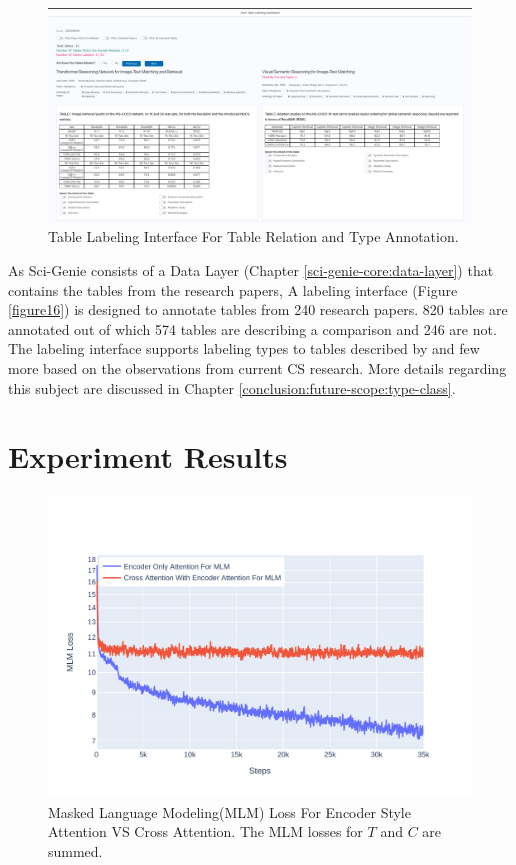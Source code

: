 \begin{figure}[h]
    \centering
    \includegraphics[width=\maxwidth{\textwidth}]{src/images/table-lable-exp.pdf}
    \caption{Table Labeling Interface For Table Relation and Type Annotation. }
    \label{figure\arabic{figurecounter}}
\end{figure}

As Sci-Genie consists of a Data Layer (Chapter \ref{sci-genie-core:data-layer}) that contains the tables from the research papers, A labeling interface (Figure \ref{figure16}) is designed to annotate tables from 240 research papers. 820 tables are annotated out of which 574 tables are describing a comparison and 246 are not. The labeling interface supports labeling types to tables described by \cite{kim2012scientific} and few more based on the observations from current CS research. More details regarding this subject are discussed in Chapter \ref{conclusion:future-scope:type-class}. 

\section{Experiment Results}
\label{table_classification:experiement-result}
\begin{figure}[h]
    \centering
    \includegraphics[width=\maxwidth{\textwidth}]{src/images/mlm-loss-comparison.pdf}
    \caption{Masked Language Modeling(MLM) Loss For Encoder Style Attention VS Cross Attention. The MLM losses for $T$ and $C$ are summed. }
    \label{figure\arabic{figurecounter}}
\end{figure}

